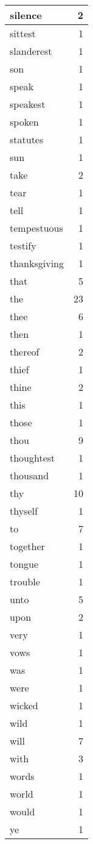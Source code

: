 \begin{center}
\begin{longtable}{l|r}
silence & 2 \\ \hline
sittest & 1 \\ \hline
slanderest & 1 \\ \hline
son & 1 \\ \hline
speak & 1 \\ \hline
speakest & 1 \\ \hline
spoken & 1 \\ \hline
statutes & 1 \\ \hline
sun & 1 \\ \hline
take & 2 \\ \hline
tear & 1 \\ \hline
tell & 1 \\ \hline
tempestuous & 1 \\ \hline
testify & 1 \\ \hline
thanksgiving & 1 \\ \hline
that & 5 \\ \hline
the & 23 \\ \hline
thee & 6 \\ \hline
then & 1 \\ \hline
thereof & 2 \\ \hline
thief & 1 \\ \hline
thine & 2 \\ \hline
this & 1 \\ \hline
those & 1 \\ \hline
thou & 9 \\ \hline
thoughtest & 1 \\ \hline
thousand & 1 \\ \hline
thy & 10 \\ \hline
thyself & 1 \\ \hline
to & 7 \\ \hline
together & 1 \\ \hline
tongue & 1 \\ \hline
trouble & 1 \\ \hline
unto & 5 \\ \hline
upon & 2 \\ \hline
very & 1 \\ \hline
vows & 1 \\ \hline
was & 1 \\ \hline
were & 1 \\ \hline
wicked & 1 \\ \hline
wild & 1 \\ \hline
will & 7 \\ \hline
with & 3 \\ \hline
words & 1 \\ \hline
world & 1 \\ \hline
would & 1 \\ \hline
ye & 1 \\ \hline
\end{longtable}
\end{center}



